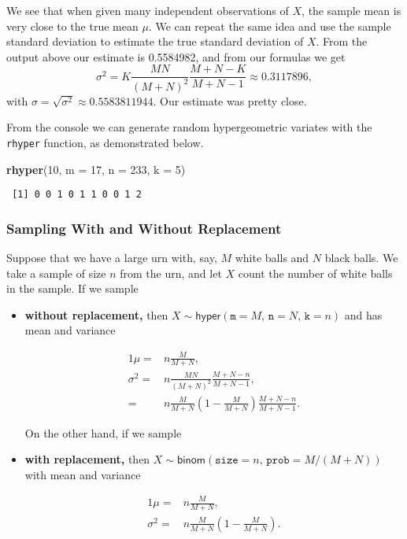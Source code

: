 \documentclass[]{book}
\newenvironment{Shaded}{\begin{snugshade}}{\end{snugshade}}
\newcommand{\KeywordTok}[1]{\textcolor[rgb]{0.13,0.29,0.53}{\textbf{{#1}}}}
\newcommand{\DataTypeTok}[1]{\textcolor[rgb]{0.13,0.29,0.53}{{#1}}}
\newcommand{\DecValTok}[1]{\textcolor[rgb]{0.00,0.00,0.81}{{#1}}}
\newcommand{\NormalTok}[1]{{#1}}
\providecommand{\tightlist}{%
  \setlength{\itemsep}{0pt}\setlength{\parskip}{0pt}}
\numberwithin{equation}{chapter}
\numberwithin{figure}{chapter}
\theoremstyle{plain}
\theoremstyle{definition}
\theoremstyle{remark}
\theoremstyle{definition}
\theoremstyle{definition}
\theoremstyle{remark}
\begin{document}
We see that when given many independent observations of \(X\), the
sample mean is very close to the true mean \(\mu\). We can repeat the
same idea and use the sample standard deviation to estimate the true
standard deviation of \(X\). From the output above our estimate is
0.5584982, and from our formulas we get \[
\sigma^{2}=K\frac{MN}{(M+N)^{2}}\frac{M+N-K}{M+N-1}\approx0.3117896,
\] with \(\sigma=\sqrt{\sigma^{2}}\approx0.5583811944\). Our estimate
was pretty close.

From the console we can generate random hypergeometric variates with the
\texttt{rhyper} function, as demonstrated below.

\begin{Shaded}
\begin{Highlighting}[]
\KeywordTok{rhyper}\NormalTok{(}\DecValTok{10}\NormalTok{, }\DataTypeTok{m =} \DecValTok{17}\NormalTok{, }\DataTypeTok{n =} \DecValTok{233}\NormalTok{, }\DataTypeTok{k =} \DecValTok{5}\NormalTok{)}
\end{Highlighting}
\end{Shaded}

\begin{verbatim}
 [1] 0 0 1 0 1 1 0 0 1 2
\end{verbatim}

\subsubsection{Sampling With and Without
Replacement}\label{sub-sampling-with-and}

Suppose that we have a large urn with, say, \(M\) white balls and \(N\)
black balls. We take a sample of size \(n\) from the urn, and let \(X\)
count the number of white balls in the sample. If we sample

\begin{itemize}
\tightlist
\item
  \textbf{without replacement,} then
  \(X\sim\mathsf{hyper}(\mathtt{m=}M,\,\mathtt{n}=N,\,\mathtt{k}=n)\)
  and has mean and variance

  \begin{alignat*}{1}
   \mu= & n\frac{M}{M+N},\\
   \sigma^{2}= & n\frac{MN}{(M+N)^{2}}\frac{M+N-n}{M+N-1},\\
   = & n\frac{M}{M+N}\left(1-\frac{M}{M+N}\right)\frac{M+N-n}{M+N-1}.
   \end{alignat*}

  On the other hand, if we sample
\item
  \textbf{with replacement,} then
  \(X\sim\mathsf{binom}(\mathtt{size}=n,\,\mathtt{prob}=M/(M+N))\) with
  mean and variance

  \begin{alignat*}{1}
   \mu= & n\frac{M}{M+N},\\
   \sigma^{2}= & n\frac{M}{M+N}\left(1-\frac{M}{M+N}\right).
   \end{alignat*}
\end{itemize}
\end{document}
